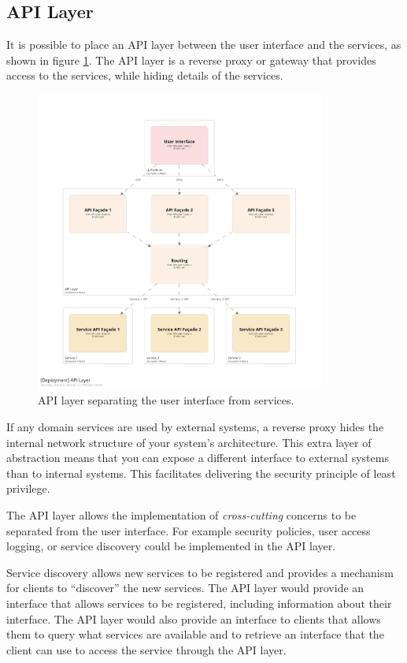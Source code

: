 \subsection{API Layer}

It is possible to place an API layer between the user interface and the services,
as shown in figure \ref{fig:api-layer}.
The API layer is a reverse proxy or gateway that provides access to the services,
while hiding details of the services.

\begin{figure}[h!]
    \centering
    \includegraphics[trim=197 197 197 197,clip,width=0.85\textwidth]{diagrams/api-layer.png}
    \caption{API layer separating the user interface from services.}
    \label{fig:api-layer}
\end{figure}

If any domain services are used by external systems, a reverse proxy hides the internal network structure of your system's architecture.
This extra layer of abstraction means that you can expose a different interface to external systems than to internal systems.
This facilitates delivering the security principle of least privilege.

The API layer allows the implementation of \emph{cross-cutting} concerns to be separated from the user interface.
For example security policies, user access logging, or service discovery could be implemented in the API layer.

Service discovery allows new services to be registered and provides a mechanism for clients to ``discover'' the new services.
The API layer would provide an interface that allows services to be registered, including information about their interface.
The API layer would also provide an interface to clients that allows them to query what services are available
and to retrieve an interface that the client can use to access the service through the API layer.

